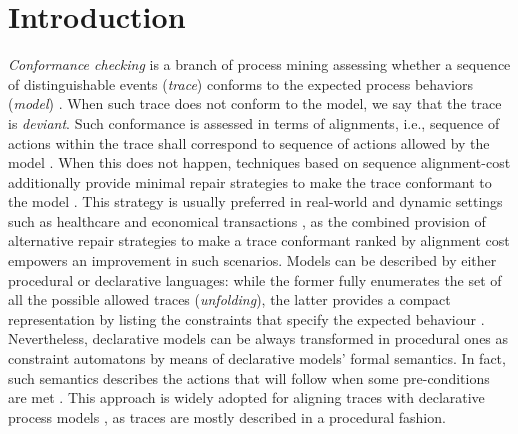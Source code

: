 \section{Introduction}
\textit{Conformance checking} is a branch of process mining  assessing whether a sequence of distinguishable events (\textit{trace}) conforms to the expected process behaviors (\textit{model}) \cite{Borrego014}. When such trace does not conform to the model, we say that the trace is \textit{deviant}.  Such conformance is assessed in terms of alignments, i.e., sequence of actions within the trace shall correspond to sequence of actions allowed by the model \cite{LeoniAD12}. When this does not happen,  techniques based on sequence alignment-cost additionally provide minimal repair strategies   to  make the trace conformant to the model \cite{LeoniAD12,XuLZ17a}. This strategy is usually preferred in real-world and dynamic settings such as healthcare \cite{LeoniMA12} and economical transactions \cite{MultiPerspective}, as the combined provision of alternative repair strategies to make a trace conformant ranked by alignment cost empowers an improvement in such scenarios. Models can be described by either procedural or declarative languages: while the former fully enumerates the set of all the possible allowed traces (\textit{unfolding}), the latter provides a compact representation by listing the constraints that specify the expected behaviour \cite{LeoniMA12,XuLZ17a}. Nevertheless, declarative models can be always transformed in procedural ones as constraint automatons  by means of declarative models' formal semantics. In fact, such semantics describes the actions that will follow when some pre-conditions are met \cite{LiPZVR20}. This approach is widely adopted for aligning traces with declarative process models \cite{Westergaard11,LeoniMA12,XuLZ17a}, as traces are mostly described in a procedural fashion.  


